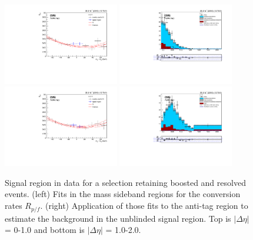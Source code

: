 \begin{figure}[h]
\centering
\includegraphics[width=0.45\textwidth]{F5/HH4b2p1SR_Fit_NRv1_unB1_retain_dEta1.pdf}
\includegraphics[width=0.45\textwidth]{F5/HH4b2p1_Plot_NRv1_unB1_retain_dEta1.pdf}\\
\includegraphics[width=0.45\textwidth]{F5/HH4b2p1SR_Fit_NRv1_unB1_retain_dEta2.pdf}
\includegraphics[width=0.45\textwidth]{F5/HH4b2p1_Plot_NRv1_unB1_retain_dEta2.pdf}
\caption{Signal region in data for a selection retaining boosted and resolved events. (left) Fits in the mass sideband regions for the conversion rates $R_{p/f}$. (right) Application of those fits to the anti-tag region to estimate the background in the unblinded signal region. Top is $|\Delta\eta|$ = 0-1.0 and bottom is $|\Delta\eta|$ = 1.0-2.0.}
\label{fig:data}
\end{figure}

